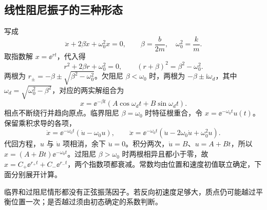 \documentclass[11pt,openany,fontset=fandol]{ctexbook}
\theoremstyle{definition}\newtheorem{example}{例}[chapter]\newtheorem{exercise}{习题}[chapter]
\begin{document}
\subsection{线性阻尼振子的三种形态}
写成
\begin{equation}\label{mp4:eq:l4-damped}
\ddot x+2\beta\dot x+\omega_0^2x=0,
\qquad\beta=\frac b{2m},\quad\omega_0^2=\frac km.
\end{equation}
取指数解 $x=\ee^{rt}$，代入得
\[
r^2+2\beta r+\omega_0^2=0,
\qquad (r+\beta)^2=\beta^2-\omega_0^2.
\]
两根为 $r_\pm=-\beta\pm\sqrt{\beta^2-\omega_0^2}$。欠阻尼 $\beta<\omega_0$ 时，两根为 $-\beta\pm\mathrm i\omega_d$，其中 $\omega_d=\sqrt{\omega_0^2-\beta^2}$，对应的两实解组合为
\[
x=\ee^{-\beta t}(A\cos\omega_dt+B\sin\omega_dt).
\]
相点不断绕行并趋向原点。临界阻尼 $\beta=\omega_0$ 时特征根重合，令 $x=\ee^{-\omega_0t}u(t)$。保留乘积求导的各项，
\[
\dot x=\ee^{-\omega_0t}(\dot u-\omega_0u),\qquad
\ddot x=\ee^{-\omega_0t}(\ddot u-2\omega_0\dot u+\omega_0^2u).
\]
代回方程，$u$ 与 $\dot u$ 项相消，余下 $\ddot u=0$。积分两次，$\dot u=B$、$u=A+Bt$，所以 $x=(A+Bt)\ee^{-\omega_0t}$。过阻尼 $\beta>\omega_0$ 时两根相异且都小于零，故 $x=C_+\ee^{r_+t}+C_-\ee^{r_-t}$，两个指数项都衰减。常数均由位置和速度初值联立确定，下面分别展开计算。

临界和过阻尼情形都没有正弦振荡因子。若反向初速度足够大，质点仍可能越过平衡位置一次；是否越过须由初态确定的系数判断。
\end{document}
